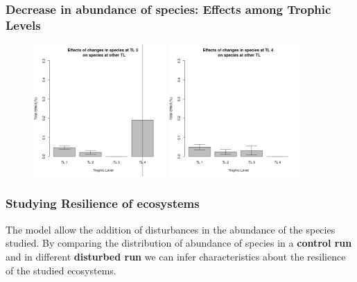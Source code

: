\documentclass[xcolor=x11names,compress]{beamer}
\renewcommand{\(}{\begin{columns}}
\renewcommand{\)}{\end{columns}}
\newcommand{\<}[1]{\begin{column}{#1}}
\renewcommand{\>}{\end{column}}
\begin{document}
\begin{frame}
\frametitle{Decrease in abundance of species: Effects among Trophic Levels}
\begin{figure}
 \includegraphics[width=0.45\textwidth]{./figures/Effects_of_TL3} 
 \includegraphics[width=0.45\textwidth]{./figures/Effects_of_TL4} 
\end{figure}
\end{frame}

\begin{frame}
\frametitle{Studying Resilience of ecosystems}
\begin{block}{}
The model allow the addition of disturbances in the abundance of the species studied. By comparing the distribution of abundance of species in a \textbf{control run} and in different \textbf{disturbed run} we can infer characteristics about the resilience of the studied ecosystems. 
\end{block}
\end{frame}


\end{document}
